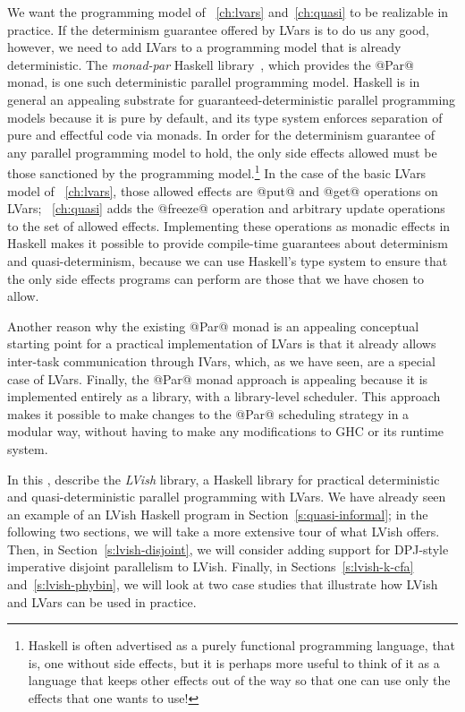 We want the programming model of ~\ref{ch:lvars}
and~\ref{ch:quasi} to be realizable in practice.  If the determinism
guarantee offered by LVars is to do us any good, however, we need to
add LVars to a programming model that is already deterministic.
The \emph{monad-par} Haskell library~\cite{monad-par}, which provides
the @Par@ monad, is one such deterministic parallel programming model.
Haskell is in general an appealing substrate for
guaranteed-deterministic parallel programming models because it is
pure by default, and its type system enforces separation of pure and
effectful code via monads.  In order for the determinism guarantee of
any parallel programming model to hold, the only side effects allowed
must be those sanctioned by the programming model.\footnote{Haskell is
often advertised as a purely functional programming language, that is,
one without side effects, but it is perhaps more useful to think of it
as a language that keeps other effects out of the way so that one can
use only the effects that one wants to use!}  In the case of the basic
LVars model of ~\ref{ch:lvars}, those allowed
effects are @put@ and @get@ operations on
LVars; ~\ref{ch:quasi} adds the @freeze@
operation and arbitrary update operations to the set of allowed
effects.  Implementing these operations as monadic effects in Haskell
makes it possible to provide compile-time guarantees about determinism
and quasi-determinism, because we can use Haskell's type system to
ensure that the only side effects programs can perform are those that
we have chosen to allow.

Another reason why the existing @Par@ monad is an appealing conceptual
starting point for a practical implementation of LVars is that it
already allows inter-task communication through IVars, which, as we
have seen, are a special case of LVars.  Finally, the @Par@ monad
approach is appealing because it is implemented entirely as a library,
with a library-level scheduler.  This approach makes it possible to
make changes to the @Par@ scheduling strategy in a modular way,
without having to make any modifications to GHC or its runtime system.

In this ,  describe
the \emph{LVish} library, a Haskell library for practical
deterministic and quasi-deterministic parallel programming with LVars.
We have already seen an example of an LVish Haskell program in
Section~\ref{s:quasi-informal}; in the following two sections, we will
take a more extensive tour of what LVish offers.  Then, in
Section~\ref{s:lvish-disjoint}, we will consider adding support for
DPJ-style imperative disjoint parallelism to LVish.  Finally, in
Sections~\ref{s:lvish-k-cfa} and~\ref{s:lvish-phybin}, we will look at
two case studies that illustrate how LVish and LVars can be used in
practice.
